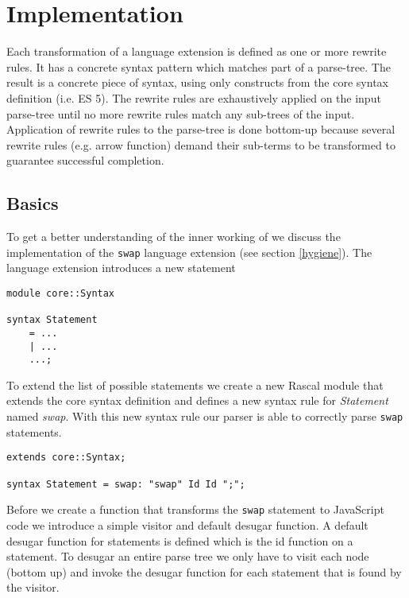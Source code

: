 \chapter{Implementation \projectname} %

\label{Chapter5}


Each transformation of a language extension is defined as one or more rewrite rules. It has a concrete syntax pattern which matches part of a parse-tree. The result is a concrete piece of syntax, using only constructs from the core syntax definition (i.e. ES 5).
The rewrite rules are exhaustively applied on the input parse-tree until no more rewrite rules match any sub-trees of the input. Application of rewrite rules to the parse-tree is done bottom-up because several rewrite rules (e.g. arrow function) demand their sub-terms to be transformed to guarantee successful completion.

\section{Basics}
To get a better understanding of the inner working of \projectname we discuss the implementation of the \lstinline$swap$ language extension (see section \ref{hygiene}). The language extension introduces a new statement 

\begin{lstlisting}[caption=Core syntax,language=rascal]
module core::Syntax

syntax Statement 
	= ...
	| ...
	...;
\end{lstlisting}

To extend the list of possible statements we create a new Rascal module that extends the core syntax definition and defines a new syntax rule for \textit{Statement} named \textit{swap}. With this new syntax rule our parser is able to correctly parse \lstinline$swap$ statements.

\begin{lstlisting}[caption=Swap statement syntax,language=rascal]
extends core::Syntax;

syntax Statement = swap: "swap" Id Id ";";
\end{lstlisting}

Before we create a function that transforms the \lstinline$swap$ statement to JavaScript code we introduce a simple visitor and default desugar function. A default desugar function for statements is defined which is the id function on a statement. To desugar an entire parse tree we only have to visit each node (bottom up) and invoke the desugar function for each statement that is found by the visitor.

